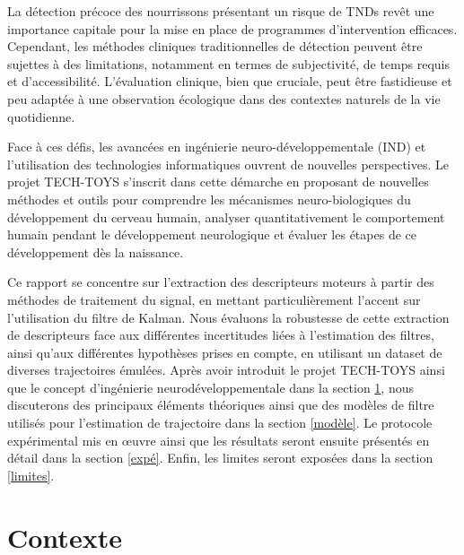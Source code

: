\documentclass[5pt]{article}
\begin{document}
La détection précoce des nourrissons présentant un risque de TNDs revêt une importance capitale pour la mise en place de programmes d'intervention efficaces. Cependant, les méthodes cliniques traditionnelles de détection peuvent être sujettes à des limitations, notamment en termes de subjectivité, de temps requis et d'accessibilité. L'évaluation clinique, bien que cruciale, peut être fastidieuse et peu adaptée à une observation écologique dans des contextes naturels de la vie quotidienne.

Face à ces défis, les avancées en ingénierie neuro-développementale (IND) et l'utilisation des technologies informatiques ouvrent de nouvelles perspectives. Le projet TECH-TOYS s'inscrit dans cette démarche en proposant de nouvelles méthodes et outils pour comprendre les mécanismes neuro-biologiques du développement du cerveau humain, analyser quantitativement le comportement humain pendant le développement neurologique et évaluer les étapes de ce développement dès la naissance.

Ce rapport se concentre sur l'extraction des descripteurs moteurs à partir des méthodes de traitement du signal, en mettant particulièrement l'accent sur l'utilisation du filtre de Kalman. Nous évaluons la robustesse de cette extraction de descripteurs face aux différentes incertitudes liées à l'estimation des filtres, ainsi qu'aux différentes hypothèses prises en compte, en utilisant un dataset de diverses trajectoires émulées. Après avoir introduit le projet TECH-TOYS ainsi que le concept d'ingénierie neurodéveloppementale dans la section \ref{contexte}, nous discuterons des principaux éléments théoriques ainsi que des modèles de filtre utilisés pour l'estimation de trajectoire dans la section \ref{modèle}. Le protocole expérimental mis en œuvre ainsi que les résultats seront ensuite présentés en détail dans la section \ref{expé}. Enfin, les limites seront exposées dans la section \ref{limites}.
\newpage
\section{Contexte}
\label{contexte}
\end{document}
